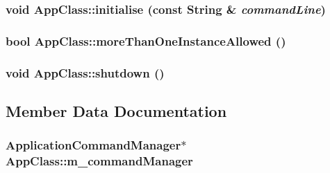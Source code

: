 \hypertarget{class_app_class_c62f2650a80211009624ff3216f9d8e3}{
\subsubsection[{initialise}]{\setlength{\rightskip}{0pt plus 5cm}void AppClass::initialise (const String \& {\em commandLine})}}
\label{class_app_class_c62f2650a80211009624ff3216f9d8e3}


\hypertarget{class_app_class_caeaf54d62cd78bed89ff531071aa2c2}{
\subsubsection[{moreThanOneInstanceAllowed}]{\setlength{\rightskip}{0pt plus 5cm}bool AppClass::moreThanOneInstanceAllowed ()}}
\label{class_app_class_caeaf54d62cd78bed89ff531071aa2c2}


\hypertarget{class_app_class_7c67ebf5b041078af03f11873954e1e9}{
\subsubsection[{shutdown}]{\setlength{\rightskip}{0pt plus 5cm}void AppClass::shutdown ()}}
\label{class_app_class_7c67ebf5b041078af03f11873954e1e9}




\subsection{Member Data Documentation}
\hypertarget{class_app_class_f5b253e442714a25f4feb5b0bb4911c1}{
\subsubsection[{m\_\-commandManager}]{\setlength{\rightskip}{0pt plus 5cm}ApplicationCommandManager$\ast$ {\bf AppClass::m\_\-commandManager}}}
\label{class_app_class_f5b253e442714a25f4feb5b0bb4911c1}


